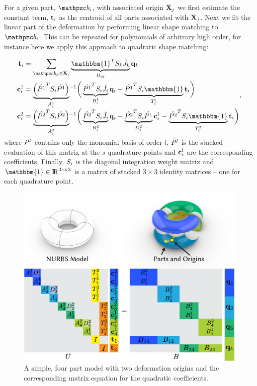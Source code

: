 For a given part, $\prt_i$, with associated origin $\bar{\mathbf{X}}_j$ we first estimate the constant term, $\mathbf{t}_i$ as the centroid of all parts associated with $\bar{\mathbf{X}}_j$.
Next we fit the linear part of the deformation by performing linear shape matching to $\prt_i$. 
This can be repeated for polynomials of arbitrary high order, for instance here we apply this approach to quadratic shape matching:

\begin{equation}
    \begin{split}
        \tr_i  & = \sum_{\prt_k \in \bar{\refX}_j} \underbrace{\mathbbm{1}^T\wt_k \samp{\Jnurbs}_k}_{B_{ik}}\vc{q}_k \\
        \vc{c}_i^1 & = \smash{\underbrace{\left(\samp{\Pmat^1}^T\wt_i\samp{\Pmat^1}\right)}_{A^1_i}}^{-1}\bigg(\underbrace{\samp{\Pmat^1}^T\wt_i\samp{\Jnurbs}_i}_{B^1_i}\vc{q}_i-\underbrace{\samp{\Pmat^1}^T\wt_i\mathbbm{1}}_{T^1_i}\tr_i\bigg)\\
        \vc{c}_i^2 & = \smash{\underbrace{\left(\samp{\Pmat^2}^T\wt_i\samp{\Pmat^2}\right)}_{A^2_i}}^{-1}\bigg(\underbrace{\samp{\Pmat^2}^T\wt_i\samp{\Jnurbs}_i}_{B^2_i}\vc{q}_i-\underbrace{\samp{\Pmat^2}^T\wt_i\samp{\Pmat^1}}_{D^2_i}\vc{c}_i^1 - \underbrace{\samp{\Pmat^2}^T\wt_i\mathbbm{1}}_{T^2_i}\tr_i\bigg)
    \end{split},
    \label{eq:hfit} 
\end{equation} where $P^l$ contains only the monomial basis of order $l$,  $\hat{P^l}$ is the stacked evaluation of this matrix at the $s$ quadrature points and $\mathbf{c}^l_i$ are the corresponding coefficients. 
Finally, $S_i$ is the diagonal integration weight matrix and $\mathbbm{1}\in\real^{3s\times3}$ is a matrix of stacked $3\times3$ identity matrices -- one for each quadrature point.

\begin{figure}[h]
    \includegraphics[width=\columnwidth]{figures/projection_operator_solve}
    \caption{A simple, four part model with two deformation origins and the corresponding matrix equation for the quadratic coefficients.}
    \label{fig:multiparts}
\end{figure}

